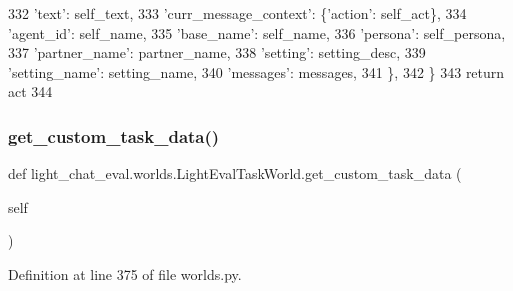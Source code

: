 \begin{DoxyCode}
332                 \textcolor{stringliteral}{'text'}: self\_text,
333                 \textcolor{stringliteral}{'curr\_message\_context'}: \{\textcolor{stringliteral}{'action'}: self\_act\},
334                 \textcolor{stringliteral}{'agent\_id'}: self\_name,
335                 \textcolor{stringliteral}{'base\_name'}: self\_name,
336                 \textcolor{stringliteral}{'persona'}: self\_persona,
337                 \textcolor{stringliteral}{'partner\_name'}: partner\_name,
338                 \textcolor{stringliteral}{'setting'}: setting\_desc,
339                 \textcolor{stringliteral}{'setting\_name'}: setting\_name,
340                 \textcolor{stringliteral}{'messages'}: messages,
341             \},
342         \}
343         \textcolor{keywordflow}{return} act
344 
\end{DoxyCode}
\mbox{\label{classlight__chat__eval_1_1worlds_1_1LightEvalTaskWorld_ad7b6b353e331f0e4eb6a0bc9198a58ee}} 
\subsubsection{\texorpdfstring{get\+\_\+custom\+\_\+task\+\_\+data()}{get\_custom\_task\_data()}}
{\footnotesize\ttfamily def light\+\_\+chat\+\_\+eval.\+worlds.\+Light\+Eval\+Task\+World.\+get\+\_\+custom\+\_\+task\+\_\+data (\begin{DoxyParamCaption}\item[{}]{self }\end{DoxyParamCaption})}



Definition at line 375 of file worlds.\+py.



